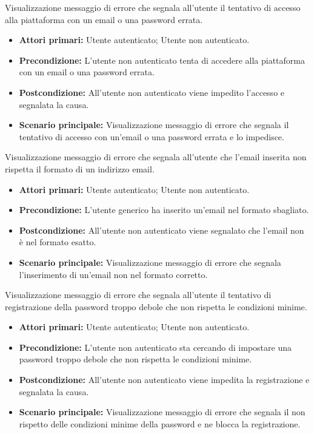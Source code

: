 Visualizzazione messaggio di errore che segnala all'utente il tentativo di accesso alla piattaforma con un email o una password errata.
\begin{itemize}
    \item \textbf{Attori primari:} Utente autenticato; Utente non autenticato.
    \item \textbf{Precondizione:} L'utente non autenticato tenta di accedere alla piattaforma con un email o una password errata.
    \item \textbf{Postcondizione:} All'utente non autenticato viene impedito l'accesso e segnalata la causa.
    \item \textbf{Scenario principale:} Visualizzazione messaggio di errore che segnala il tentativo di accesso con un'email o una password errata e lo impedisce.
\end{itemize}

Visualizzazione messaggio di errore che segnala all'utente che l'email inserita non rispetta il formato di un indirizzo email.
\begin{itemize}
    \item \textbf{Attori primari:} Utente autenticato; Utente non autenticato.
    \item \textbf{Precondizione:} L'utente generico ha inserito un'email nel formato sbagliato.
    \item \textbf{Postcondizione:} All'utente non autenticato viene segnalato che l'email non è nel formato esatto.
    \item \textbf{Scenario principale:} Visualizzazione messaggio di errore che segnala l'inserimento di un'email non nel formato corretto.
\end{itemize}

Visualizzazione messaggio di errore che segnala all'utente il tentativo di registrazione della password troppo debole che non rispetta le condizioni minime.
\begin{itemize}
    \item \textbf{Attori primari:} Utente autenticato; Utente non autenticato.
    \item \textbf{Precondizione:} L'utente non autenticato sta cercando di impostare una password troppo debole che non rispetta le condizioni minime.
    \item \textbf{Postcondizione:} All'utente non autenticato viene impedita la registrazione e segnalata la causa.
    \item \textbf{Scenario principale:} Visualizzazione messaggio di errore che segnala il non rispetto delle condizioni minime della password e ne blocca la registrazione.
\end{itemize}

